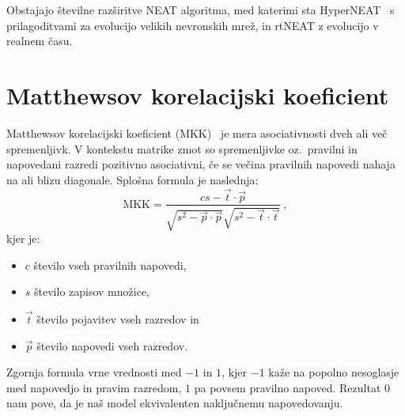 \documentclass[a4paper,12pt,openright]{book}
\begin{document}
    Obstajajo številne razširitve NEAT algoritma, med katerimi sta HyperNEAT~\cite{Iba_2018} s prilagoditvami za evolucijo velikih nevronskih mrež,
    in rtNEAT z evolucijo v realnem času.


    \newpage
    \section{Matthewsov korelacijski koeficient}\label{sec:mkk}
    Matthewsov korelacijski koeficient (MKK)~\cite{mcc_wiki} je mera asociativnosti dveh ali več spremenljivk.
    V kontekstu matrike zmot so spremenljivke oz.\ pravilni in napovedani razredi pozitivno asociativni, če se večina pravilnih napovedi nahaja na ali blizu diagonale.
    Splošna formula je naslednja:
    \begin{equation}
        \text{MKK}={\frac {cs-{\vec {t}}\cdot {\vec {p}}}{{\sqrt {s^{2}-{\vec {p}}\cdot {\vec {p}}}}{\sqrt {s^{2}-{\vec {t}}\cdot {\vec {t}}}}}}\:,
        \label{eq:mcc}
    \end{equation}
    kjer je:
    \begin{itemize}
        \item $c$ število vseh pravilnih napovedi,
        \item $s$ število zapisov množice,
        \item $\vec{t}$ število pojavitev vseh razredov in
        \item $\vec{p}$ število napovedi vseh razredov.
    \end{itemize}

    Zgornja formula vrne vrednosti med $-1$ in $1$, kjer $-1$ kaže na popolno nesoglasje med napovedjo in pravim razredom,
    $1$ pa povsem pravilno napoved.
    Rezultat $0$ nam pove, da je naš model ekvivalenten naključnemu napovedovanju.
\end{document}
